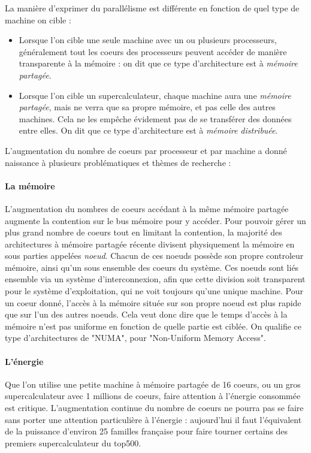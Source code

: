 La manière d'exprimer du parallélisme est différente en fonction de quel type de machine on cible :
\begin{itemize}
  \item Lorsque l'on cible une seule machine avec un ou plusieurs processeurs, généralement tout les coeurs des processeurs peuvent accéder de manière transparente à la mémoire : on dit que ce type d'architecture est à \emph{mémoire partagée}.
  \item Lorsque l'on cible un supercalculateur, chaque machine aura une \emph{mémoire partagée}, mais ne verra que sa propre mémoire, et pas celle des autres machines. Cela ne les empêche évidement pas de se transférer des données entre elles. On dit que ce type d'architecture est à \emph{mémoire distribuée}.
\end{itemize}

L'augmentation du nombre de coeurs par processeur et par machine a donné naissance à plusieurs problématiques et thèmes de recherche :

\paragraph{La mémoire}
L'augmentation du nombres de coeurs accédant à la même mémoire partagée augmente la contention sur le bus mémoire pour y accéder.
Pour pouvoir gérer un plus grand nombre de coeurs tout en limitant la contention, la majorité des architectures à mémoire partagée récente divisent physiquement la mémoire en sous parties appelées \emph{noeud}.
Chacun de ces noeuds possède son propre controleur mémoire, ainsi qu'un sous ensemble des coeurs du système.
Ces noeuds sont liés ensemble via un système d'interconnexion, afin que cette division soit transparent pour le système d'exploitation, qui ne voit toujours qu'une unique machine.
Pour un coeur donné, l'accès à la mémoire située sur son propre noeud est plus rapide que sur l'un des autres noeuds. Cela veut donc dire que le temps d'accès à la mémoire n'est pas uniforme en fonction de quelle partie est ciblée.
On qualifie ce type d'architectures de "NUMA", pour "Non-Uniform Memory Access".

\paragraph{L'énergie}

Que l'on utilise une petite machine à mémoire partagée de 16 coeurs, ou un gros supercalculateur avec 1 millions de coeurs, faire attention à l'énergie consommée est critique.
L'augmentation continue du nombre de coeurs ne pourra pas se faire sans porter une attention particulière à l'énergie : aujourd'hui il faut l'équivalent de la puissance d'environ 25 familles française pour faire tourner certains des premiers supercalculateur du top500.

